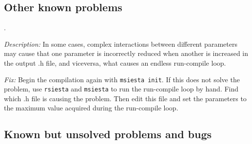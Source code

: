 \begin{description}
\end{description}



\subsection{Other known problems}

\begin{description}
\itemsep 10pt
\parsep 0pt

\item[{\bf rrsiesta enters an infinite run-compile loop}].

{\it Description:}
In some cases, complex interactions between different parameters
may cause that one parameter is incorrectly 
reduced when another is increased in the output .h file, 
and viceversa, what causes an endless run-compile loop.

{\it Fix:}
Begin the compilation again with {\tt msiesta init}.
If this does not solve the problem, use {\tt rsiesta} and {\tt msiesta} 
to run the run-compile loop by hand. 
Find which .h file is causing the problem. Then edit
this file and set the parameters to the maximum value acquired
during the run-compile loop.

%
%


%
%

\end{description}



\subsection{Known but unsolved problems and bugs}

